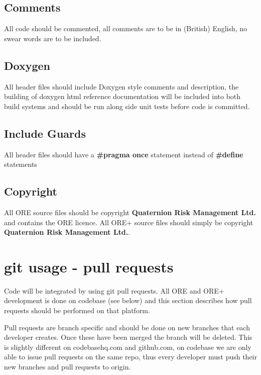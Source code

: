 \documentclass[12pt, a4paper]{article}
\begin{document}
\subsection*{Comments}
All code should be commented, all comments are to be in (British) English, no swear words are to be included.

\subsection*{Doxygen}
All header files should include Doxygen style comments and description, the building of doxygen html reference documentation will be included into both build systems and should be run along side unit tests before code is committed.

\subsection*{Include Guards}
All header files should have a \textbf{\#pragma once} statement instead of \textbf{\#define} statements

\subsection*{Copyright}
All ORE source files should be copyright \textbf{Quaternion Risk Management Ltd.} and contains the ORE licence.
All ORE+ source files should simply be copyright \textbf{Quaternion Risk Management Ltd.}.

\section*{git usage - pull requests}
Code will be integrated by using git pull requests. All ORE and ORE+ development is done on codebase (see below) and this section describes how pull requests should be performed on that platform.

Pull requests are branch specific and should be done on new branches that each developer creates. Once these have been merged the branch will be deleted. This is slightly different on codebasehq.com and github.com, on codebase we are only able to issue pull requests on the same repo, thus every developer must push their new branches and pull requests to origin.
\end{document}
